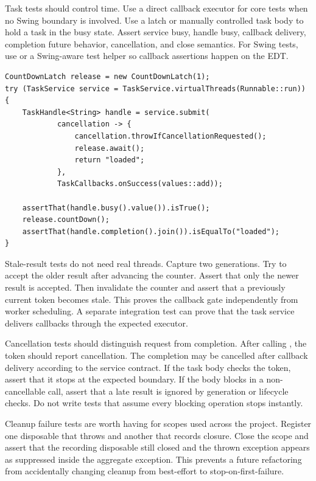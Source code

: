 Task tests should control time. Use a direct callback executor for core tests
when no Swing boundary is involved. Use a latch or manually controlled task
body to hold a task in the busy state. Assert service busy, handle busy,
callback delivery, completion future behavior, cancellation, and close
semantics. For Swing tests, use  or a Swing-aware test
helper so callback assertions happen on the EDT.

\begin{lstlisting}[caption={A deterministic core task scenario.}]
CountDownLatch release = new CountDownLatch(1);
try (TaskService service = TaskService.virtualThreads(Runnable::run)) {
    TaskHandle<String> handle = service.submit(
            cancellation -> {
                cancellation.throwIfCancellationRequested();
                release.await();
                return "loaded";
            },
            TaskCallbacks.onSuccess(values::add));

    assertThat(handle.busy().value()).isTrue();
    release.countDown();
    assertThat(handle.completion().join()).isEqualTo("loaded");
}
\end{lstlisting}

Stale-result tests do not need real threads. Capture two generations. Try to
accept the older result after advancing the counter. Assert that only the newer
result is accepted. Then invalidate the counter and assert that a previously
current token becomes stale. This proves the callback gate independently from
worker scheduling. A separate integration test can prove that the task service
delivers callbacks through the expected executor.

Cancellation tests should distinguish request from completion. After calling
, the token should report cancellation. The completion may be
cancelled after callback delivery according to the service contract. If the
task body checks the token, assert that it stops at the expected boundary. If
the body blocks in a non-cancellable call, assert that a late result is ignored
by generation or lifecycle checks. Do not write tests that assume every
blocking operation stops instantly.

Cleanup failure tests are worth having for scopes used across the project.
Register one disposable that throws and another that records closure. Close the
scope and assert that the recording disposable still closed and the thrown
exception appears as suppressed inside the aggregate exception. This prevents a
future refactoring from accidentally changing cleanup from best-effort to
stop-on-first-failure.

